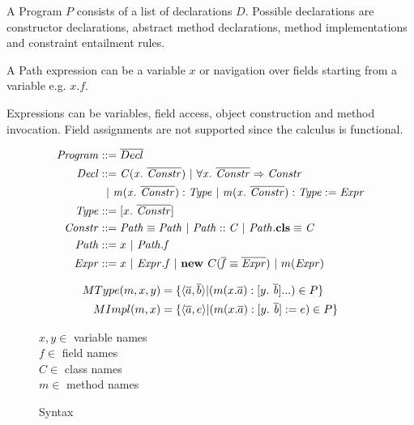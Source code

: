 A Program $P$ consists of a list of declarations $D$.
Possible declarations are constructor declarations,
abstract method declarations, method implementations and constraint entailment rules.

A Path expression can be a variable $x$ or navigation over fields starting from a variable e.g. $x.f$.

Expressions can be variables, field access, object construction and method invocation.
Field assignments are not supported since the calculus is functional.

\begin{figure}
\setlength{\grammarindent}{5em} %
\begin{align*}
\mathit{Program} &::= \ovl{Decl} \\
\mathit{Decl} &::= \constr{C}{x}{\overline{Constr}} %
                 \ |\ \progEnt{x}{\overline{Constr}}{Constr} \\
              &\ \ |\ \mDecl{m}{x}{\overline{Constr}}{Type} %
                 \ |\ \mImpl{m}{x}{\overline{Constr}}{Type}{Expr} \\ %
\mathit{Type} &::= \type{x}{\ovl{Constr}} \\
\mathit{Constr} &::= \pathEq{Path}{Path} %
                \ |\ \instOf{Path}{C} %
                \ |\ \instBy{Path}{C} \\ %
\mathit{Path} &::= x \ |\ \mathit{Path.f}\\
\mathit{Expr} &::= x
              \ |\ \mathit{Expr.f}
              \ |\ \newInst{C}{\overline{f}}{\overline{Expr}} %
              \ |\ m(\mathit{Expr})
\end{align*}

\begin{align*}
MType(m, x, y) &= \{ \langle\overline{a}, \overline{b}\rangle | (m(x. \overline{a}): \type{y}{\ovl{b}}...) \in P \} \\ %
MImpl(m, x) &= \{\langle\overline{a}, e\rangle | (m(x. \overline{a}): \type{y}{\ovl{b}} := e) \in P \}
\end{align*}

$x, y \in$ variable names\\
$f \in$ field names\\
$C \in$ class names\\
$m \in$ method names
\caption{Syntax}
\label{fig:dcc-syntax}
\end{figure}

